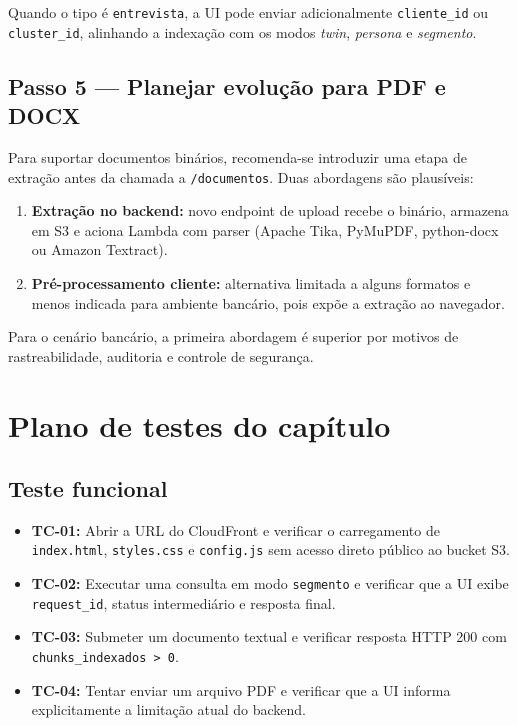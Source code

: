 Quando o tipo \'e \texttt{entrevista}, a UI pode enviar adicionalmente
\texttt{cliente\_id} ou \texttt{cluster\_id}, alinhando a indexa\c{c}\~ao com
os modos \textit{twin}, \textit{persona} e \textit{segmento}.

\subsection{Passo 5 --- Planejar evolu\c{c}\~ao para PDF e DOCX}

Para suportar documentos bin\'arios, recomenda-se introduzir uma etapa de
extra\c{c}\~ao antes da chamada a \texttt{/documentos}. Duas abordagens s\~ao
plaus\'iveis:

\begin{enumerate}[leftmargin=*]
  \item \textbf{Extra\c{c}\~ao no backend:} novo endpoint de upload recebe o
        bin\'ario, armazena em S3 e aciona Lambda com parser (Apache Tika,
        PyMuPDF, python-docx ou Amazon Textract).
  \item \textbf{Pr\'e-processamento cliente:} alternativa limitada a alguns
        formatos e menos indicada para ambiente banc\'ario, pois exp\~oe a
        extra\c{c}\~ao ao navegador.
\end{enumerate}

Para o cen\'ario banc\'ario, a primeira abordagem \'e superior por motivos
de rastreabilidade, auditoria e controle de seguran\c{c}a.

\section{Plano de testes do cap\'itulo}

\subsection{Teste funcional}

\begin{itemize}[leftmargin=*]
  \item \textbf{TC-01:} Abrir a URL do CloudFront e verificar o
        carregamento de \texttt{index.html}, \texttt{styles.css} e
        \texttt{config.js} sem acesso direto p\'ublico ao bucket S3.
  \item \textbf{TC-02:} Executar uma consulta em modo \texttt{segmento}
        e verificar que a UI exibe \texttt{request\_id}, status intermedi\'ario
        e resposta final.
  \item \textbf{TC-03:} Submeter um documento textual e verificar resposta
        HTTP 200 com \texttt{chunks\_indexados > 0}.
  \item \textbf{TC-04:} Tentar enviar um arquivo PDF e verificar que a UI
        informa explicitamente a limita\c{c}\~ao atual do backend.
\end{itemize}

